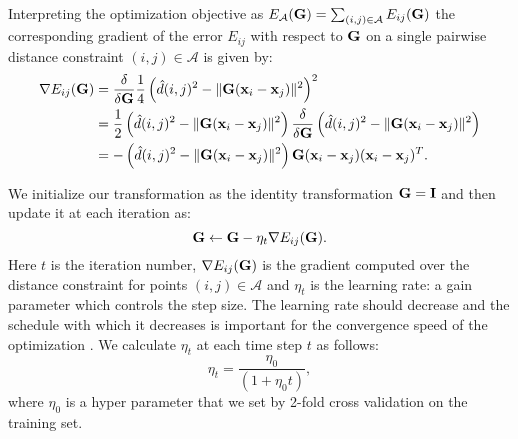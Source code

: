 Interpreting the optimization objective as $E_{\mathcal{A}}(\mathbf{G}) = \sum_{(i,j)\in\mathcal{A}} E_{ij}(\mathbf{G})$ the corresponding gradient of the error $E_{ij}$ with respect to $\mathbf{G}$ on a single pairwise distance constraint $(i,j) \in \mathcal{A}$ is given by:
\begin{align}
\nabla E_{ij}(\mathbf{G})  &= \frac{\delta}{\delta \mathbf{G}} \frac{1}{4} \left( \hat{d}(i,j)^2 -  \|\mathbf{G}(\mathbf{x}_i - \mathbf{x}_j)\|^2 \right)^2 \\
&= \frac{1}{2} \left( \hat{d}(i,j)^2 -  \|\mathbf{G}(\mathbf{x}_i - \mathbf{x}_j)\|^2 \right) \frac{\delta}{\delta \mathbf{G}} \left( \hat{d}(i,j)^2 -  \|\mathbf{G}(\mathbf{x}_i - \mathbf{x}_j)\|^2 \right) \\
&= -\left( \hat{d}(i,j)^2 -  \|\mathbf{G}(\mathbf{x}_i - \mathbf{x}_j)\|^2\right) \mathbf{G} (\mathbf{x}_i - \mathbf{x}_j)(\mathbf{x}_i - \mathbf{x}_j)^T.
\label{eq:opt_grad}
\end{align}

We initialize our transformation as the identity transformation $\mathbf{G} = \mathbf{I}$ and then update it at each iteration as:
\begin{equation}
\mathbf{G} \leftarrow \mathbf{G} - \eta_{t} \nabla E_{ij}(\mathbf{G}).
\label{eq:update}
\end{equation}
Here $t$ is the iteration number, $\nabla E_{ij}(\mathbf{G})$ is the gradient computed over the distance constraint for points $(i,j) \in \mathcal{A}$ and $\eta_{t}$ is the learning rate: a gain parameter which controls the step size. The learning rate should decrease and the schedule with which it decreases is important for the convergence speed of the optimization \cite{xu2011towards}. We calculate $\eta_{t}$ at each time step $t$ as follows:
\begin{equation}
\eta_{t} = \frac{\eta_0}{\left(1+ \eta_0 t \right)},
\label{eq:eta_update}
\end{equation}
where $\eta_0$ is a hyper parameter that we set by 2-fold cross validation on the training set.




